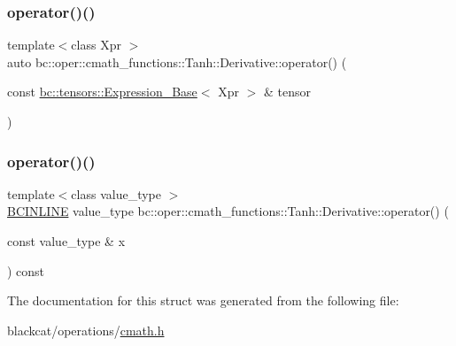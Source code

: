 \mbox{\label{structbc_1_1oper_1_1cmath__functions_1_1Tanh_1_1Derivative_ab756fc9613207ed446b956ff42539d2b}} 
\subsubsection{\texorpdfstring{operator()()}{operator()()}\hspace{0.1cm}{\footnotesize\ttfamily [2/3]}}
{\footnotesize\ttfamily template$<$class Xpr $>$ \\
auto bc\+::oper\+::cmath\+\_\+functions\+::\+Tanh\+::\+Derivative\+::operator() (\begin{DoxyParamCaption}\item[{const \hyperlink{classbc_1_1tensors_1_1Expression__Base}{bc\+::tensors\+::\+Expression\+\_\+\+Base}$<$ Xpr $>$ \&}]{tensor }\end{DoxyParamCaption})\hspace{0.3cm}{\ttfamily [inline]}}

\mbox{\label{structbc_1_1oper_1_1cmath__functions_1_1Tanh_1_1Derivative_a03eec0c845330cda9e982670e524e792}} 
\subsubsection{\texorpdfstring{operator()()}{operator()()}\hspace{0.1cm}{\footnotesize\ttfamily [3/3]}}
{\footnotesize\ttfamily template$<$class value\+\_\+type $>$ \\
\hyperlink{common_8h_a6699e8b0449da5c0fafb878e59c1d4b1}{B\+C\+I\+N\+L\+I\+NE} value\+\_\+type bc\+::oper\+::cmath\+\_\+functions\+::\+Tanh\+::\+Derivative\+::operator() (\begin{DoxyParamCaption}\item[{const value\+\_\+type \&}]{x }\end{DoxyParamCaption}) const\hspace{0.3cm}{\ttfamily [inline]}}



The documentation for this struct was generated from the following file\+:\begin{DoxyCompactItemize}
\item 
blackcat/operations/\hyperlink{cmath_8h}{cmath.\+h}\end{DoxyCompactItemize}
